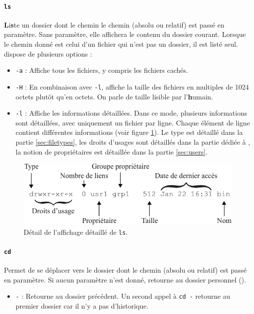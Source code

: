 \paragraph{\texttt{ls}} 
\textbf{L}i\textbf{s}te un dossier dont le chemin le chemin (absolu ou relatif) est passé en paramètre. Sans paramètre, elle affichera le contenu du dossier courant. Lorsque le chemin donné est celui d'un fichier qui n'est pas un dossier, il est listé seul. \newline
{} dispose de plusieurs options : 
\begin{itemize}
    \item \texttt{-a} : Affiche tous les fichiers, y compris les fichiers cachés. 
    \item \texttt{-H} : En combinaison avec \texttt{-l}, affiche la taille des fichiers en multiples de 1024 octets plutôt qu'en octets. On parle de taille lisible par l'\textbf{h}umain.
    \item \texttt{-l} : Affiche les informations détaillées.
    Dans ce mode, plusieurs informations sont détaillées, avec uniquement un fichier par ligne. Chaque élément de ligne contient différentes informations (voir figure \ref{fig:lsl}). Le type est détaillé dans la partie \ref{sec:filetypes}, les droits d'usages sont détaillés dans la partie dédiée à , la notion de propriétaires est détaillée dans la partie \ref{sec:users}.
\end{itemize}

\begin{figure}[h!]
        \includegraphics{res/lsl.pdf}
        \centering
        \caption{Détail de l'affichage détaillé de \texttt{ls}.}
    \label{fig:lsl}
\end{figure}

\paragraph{\texttt{cd}} 
Permet de se déplacer vers le dossier dont le chemin (absolu ou relatif) est passé en paramètre. Si aucun paramètre n'est donné, retourne au dossier personnel (\texttt{\tilde}).
\begin{itemize}
    \item \texttt{-} : Retourne au dossier précédent. Un second appel à \texttt{cd -} retourne au premier dossier car il n'y a pas d'historique.
\end{itemize}
\vspace{3mm}

